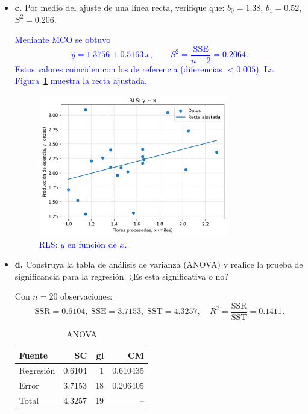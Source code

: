 \documentclass[10pt]{article}
\begin{document}
\begin{itemize}
    \item \textbf{c.} Por medio del ajuste de una línea recta, verifique que: $b_0 = 1.38$, $b_1 = 0.52$, $S^2 = 0.206$.\\
\textcolor{blue}{
Mediante MCO se obtuvo
\[ \hat{y} = 1.3756 + 0.5163\,x, \qquad S^2 = \frac{\mathrm{SSE}}{n-2} = 0.2064. \]
Estos valores coinciden con los de referencia (diferencias $<\!0.005$). La Figura~\ref{fig:fl_line} muestra la recta ajustada.
\begin{figure}[H]
    \centering
    \includegraphics[width=0.78\textwidth]{../plots/python/ejercicio3/rls_line.png}
    \caption{RLS: $y$ en función de $x$.}
    \label{fig:fl_line}
\end{figure}
}

\item \textbf{d.} Construya la tabla de análisis de varianza (ANOVA) y realice la prueba de significancia para la regresión. ¿Es esta significativa o no?\\
	\begingroup
	\color{blue}

	Con $n=20$ observaciones: 
	\[
	\mathrm{SSR}=0.6104,\; \mathrm{SSE}=3.7153,\; \mathrm{SST}=4.3257,
	\quad R^2=\frac{\mathrm{SSR}}{\mathrm{SST}}=0.1411.
	\]

	\begin{table}[H]
	\centering
	{\color{blue}
	\caption{ANOVA }
	\label{tab:anova_ej3}
	\begin{tabular}{|l|r|r|r|}
		\hline
		\textbf{Fuente} & \textbf{SC} & \textbf{gl} & \textbf{CM} \\
		\hline
		Regresión & 0.6104 & 1  & 0.610435 \\
		Error     & 3.7153 & 18 & 0.206405 \\
		Total     & 4.3257 & 19 & --       \\
		\hline
	\end{tabular}
	}
	\end{table}


\end{itemize}
\end{document}
